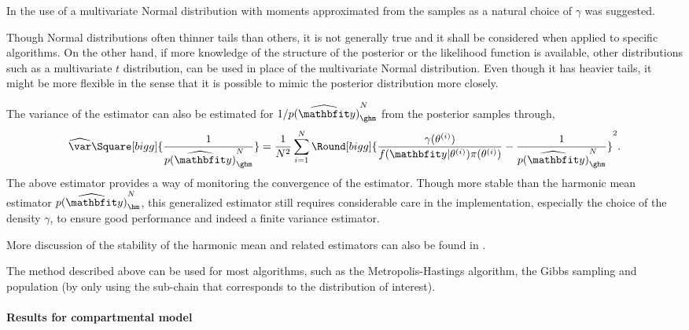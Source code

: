 In \cite{Gelfand:1994ux} the use of a multivariate Normal distribution with moments approximated from the samples as a natural choice of $\gamma$ was suggested.
\begin{draftpar}
Though Normal distributions often  thinner tails than others, it is not generally true and it shall be considered when applied to specific algorithms. On the other hand, if more knowledge of the structure of the posterior or the likelihood function is available, other distributions such as a multivariate $t$ distribution, can be used in place of the multivariate Normal distribution. Even though it has heavier tails, it might be more flexible in the sense that it is possible to mimic the posterior distribution more closely.
\end{draftpar}

The variance of the estimator can also be estimated for $1/\widehat{p(\data)}_{\ghm}^N$ from the posterior samples through,
\begin{equation}
  \widehat{\var}\Square[bigg]{\frac{1}{\widehat{p(\data)}_{\ghm}^N}} =
  \frac{1}{N^2}\sum_{i=1}^N \Round[bigg]{
    \frac{\gamma(\theta^{(i)})}{f(\data|\theta^{(i)})\pi(\theta^{(i)})}
    - \frac{1}{\widehat{p(\data)}_{\ghm}^N}}^2.
\end{equation}
The above estimator provides a way of monitoring the convergence of the estimator. Though more stable than the harmonic mean estimator $\widehat{p(\data)}_{\hm}^N$, this generalized estimator still requires considerable care in the implementation, especially the choice of the density $\gamma$, to ensure good performance and indeed a finite variance estimator.
\begin{draftpar}
More discussion of the stability of the harmonic mean and related estimators can also be found in \cite{Raftery:2007ud}.
\end{draftpar}

The method described above can be used for most \mcmc algorithms, such as the Metropolis-Hastings algorithm, the Gibbs sampling and population \mcmc (by only using the sub-chain that corresponds to the distribution of interest).

\paragraph{Results for \pet compartmental model}

